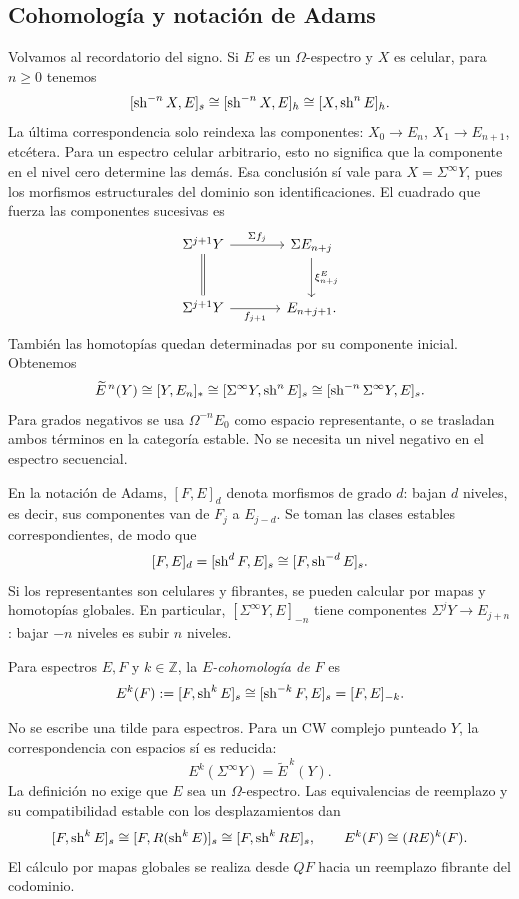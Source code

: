 \subsection{Cohomología y notación de Adams}
Volvamos al recordatorio del signo. Si $E$ es un $\Omega$-espectro y $X$ es celular, para $n\ge0$ tenemos
\[
[\operatorname{sh}^{-n}X,E]_s\cong[\operatorname{sh}^{-n}X,E]_h
\cong[X,\operatorname{sh}^nE]_h.
\]
La última correspondencia solo reindexa las componentes: $X_0\to E_n$, $X_1\to E_{n+1}$, etcétera. Para un espectro celular arbitrario, esto no significa que la componente en el nivel cero determine las demás. Esa conclusión sí vale para $X=\Sigma^\infty Y$, pues los morfismos estructurales del dominio son identificaciones. El cuadrado que fuerza las componentes sucesivas es
\[
\begin{tikzcd}[column sep=large,row sep=large]
\Sigma^{j+1}Y\arrow[r,"\Sigma f_j"]\arrow[d,equal]
&\Sigma E_{n+j}\arrow[d,"\xi^E_{n+j}"]\\
\Sigma^{j+1}Y\arrow[r,"f_{j+1}"']&E_{n+j+1}.
\end{tikzcd}
\]
También las homotopías quedan determinadas por su componente inicial. Obtenemos
\[
\widetilde E^{\,n}(Y)\cong[Y,E_n]_*
\cong[\Sigma^\infty Y,\operatorname{sh}^nE]_s
\cong[\operatorname{sh}^{-n}\Sigma^\infty Y,E]_s.
\]
Para grados negativos se usa $\Omega^{-n}E_0$ como espacio representante, o se trasladan ambos términos en la categoría estable. No se necesita un nivel negativo en el espectro secuencial.

En la notación de Adams, $[F,E]_d$ denota morfismos de grado $d$: bajan $d$ niveles, es decir, sus componentes van de $F_j$ a $E_{j-d}$. Se toman las clases estables correspondientes, de modo que
\[
[F,E]_d=[\operatorname{sh}^dF,E]_s\cong[F,\operatorname{sh}^{-d}E]_s.
\]
Si los representantes son celulares y fibrantes, se pueden calcular por mapas y homotopías globales. En particular, $[\Sigma^\infty Y,E]_{-n}$ tiene componentes $\Sigma^jY\to E_{j+n}$: bajar $-n$ niveles es subir $n$ niveles.

\begin{defi}\label{defi:c19-cohomologia}
Para espectros $E,F$ y $k\in\mathbb Z$, la \emph{$E$-cohomología de $F$} es
\[
E^k(F):=[F,\operatorname{sh}^kE]_s
\cong[\operatorname{sh}^{-k}F,E]_s=[F,E]_{-k}.
\]
\end{defi}
No se escribe una tilde para espectros. Para un CW complejo punteado $Y$, la correspondencia con espacios sí es reducida:
\[
E^k(\Sigma^\infty Y)=\widetilde E^{\,k}(Y).
\]
La definición no exige que $E$ sea un $\Omega$-espectro. Las equivalencias de reemplazo y su compatibilidad estable con los desplazamientos dan
\[
[F,\operatorname{sh}^kE]_s\cong[F,R(\operatorname{sh}^kE)]_s
\cong[F,\operatorname{sh}^kRE]_s,
\qquad E^k(F)\cong(RE)^k(F).
\]
El cálculo por mapas globales se realiza desde $QF$ hacia un reemplazo fibrante del codominio.

